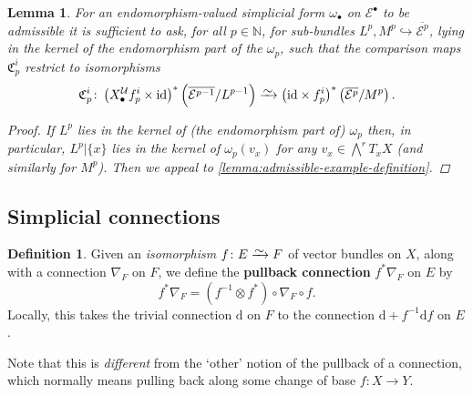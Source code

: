 \documentclass[11pt,fleqn]{article}
\theoremstyle{plain}
\newtheorem{lemma}[theorem]{Lemma}
\theoremstyle{definition}
\newtheorem{definition}[theorem]{Definition}
\theoremstyle{remark}
\numberwithin{equation}{theorem}
\newcommand{\cover}{\mathcal{U}}
\newcommand{\restricted}{\mathbin{\big\vert}}
\newcommand{\id}{\mathrm{id}}
\newcommand{\congto}{\xrightarrow{\raisebox{-.5ex}[0ex][0ex]{$\sim$}}}
\newcommand{\define}[1]{\textbf{#1}}
\newcommand{\nerve}[1]{X_{#1}^\cover}
\newcommand{\comparison}[1]{\mathfrak{C}_{#1}}
\renewcommand{\d}{\mathrm{d}}
\begin{document}
        \begin{lemma}\label{lemma:admissible-endomorphism-valued-form-criterion}
            For an endomorphism-valued simplicial form $\omega_\bullet$ on $\mathcal{E}^\bullet$ to be admissible it is sufficient to ask, for all $p\in\mathbb{N}$, for sub-bundles $L^p,M^p\hookrightarrow\overline{\mathcal{E}^p}$, lying in the kernel of the endomorphism part of the $\omega_p$, such that the comparison maps $\comparison{p}^i$ restrict to isomorphisms
            \[
                \comparison{p}^i\colon
                \left(\nerve{\bullet} f^i_p\times\id\right)^*\left(\overline{\mathcal{E}^{p-1}}/L^{p-1}\right)
                \congto
                \left(\id\times f_p^i\right)^*\left(\overline{\mathcal{E}^p}/M^p\right).
            \]
            \begin{proof}
                If $L^p$ lies in the kernel of (the endomorphism part of) $\omega_p$ then, in particular, $L^p\restricted \{x\}$ lies in the kernel of $\omega_p(v_x)$ for any $v_x\in\bigwedge^r T_x X$ (and similarly for $M^p$).
                Then we appeal to \cref{lemma:admissible-example-definition}.
            \end{proof}
        \end{lemma}


    \subsection{Simplicial connections}

        \begin{definition}
            Given an \emph{isomorphism} $f\colon E\congto F$ of vector bundles on $X$, along with a connection $\nabla_F$ on $F$, we define the \define{pullback connection} $f^*\nabla_F$ on $E$ by
            \[
                f^*\nabla_F = (f^{-1}\otimes f^*)\circ\nabla_F\circ f.
            \]
            Locally, this takes the trivial connection $\d$ on $F$ to the connection $\d+f^{-1}\d f$ on $E$.

            Note that this is \emph{different} from the `other' notion of the pullback of a connection, which normally means pulling back along some change of base $f\colon X\to Y$.
        \end{definition}
\end{document}
